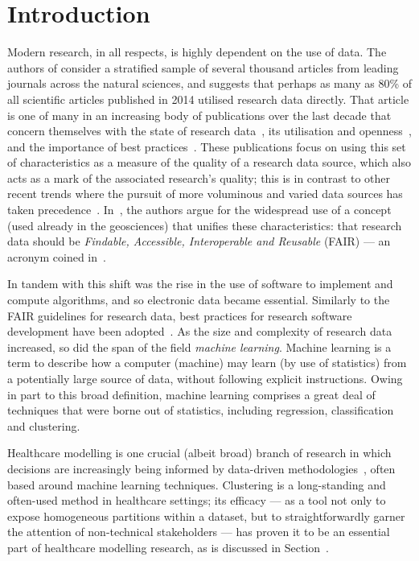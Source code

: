\section{Introduction}\label{sec:intro}

Modern research, in all respects, is highly dependent on the use of data. The
authors of \cite{Womack2015} consider a stratified sample of several thousand
articles from leading journals across the natural sciences, and suggests that
perhaps as many as 80\% of all scientific articles published in 2014 utilised
research data directly. That article is one of many in an increasing body of
publications over the last decade that concern themselves with the state of
research data~\cite{Higman2019}, its utilisation and
openness~\cite{Aslam2017,Zuiderwijk2020}, and the importance of best
practices~\cite{Colavizza2020,Corti2019}. These publications focus on using this
set of characteristics as a measure of the quality of a research data source,
which also acts as a mark of the associated research's quality; this is in
contrast to other recent trends where the pursuit of more voluminous and varied
data sources has taken precedence~\cite{Batistic2019}. In~\cite{Stall2019}, the
authors argue for the widespread use of a concept (used already in the
geosciences) that unifies these characteristics: that research data should be
\emph{Findable, Accessible, Interoperable and Reusable} (FAIR) --- an acronym
coined in~\cite{Wilkinson2016}.

In tandem with this shift was the rise in the use of software to implement and
compute algorithms, and so electronic data became essential. Similarly to the
FAIR guidelines for research data, best practices for research software
development have been adopted~\cite{Aberdour2007,Benureau2018,Jimenez2017}. As
the size and complexity of research data increased, so did the span of the field
\emph{machine learning}. Machine learning is a term to describe how a computer
(machine) may learn (by use of statistics) from a potentially large source of
data, without following explicit instructions. Owing in part to this broad
definition, machine learning comprises a great deal of techniques that were
borne out of statistics, including regression, classification and clustering.

Healthcare modelling is one crucial (albeit broad) branch of research in which
decisions are increasingly being informed by data-driven
methodologies~\cite{Alexander2018,Belle2015,RiosZertuche2020}, often based
around machine learning techniques. Clustering is a long-standing and often-used
method in healthcare settings; its efficacy --- as a tool not only to expose
homogeneous partitions within a dataset, but to straightforwardly garner the
attention of non-technical stakeholders --- has proven it to be an essential
part of healthcare modelling research, as is discussed in
Section~\cite{subsec:healthcare}.

